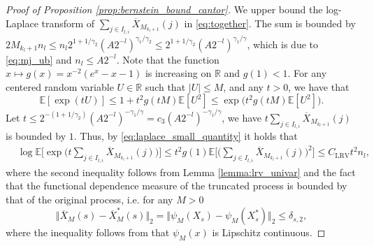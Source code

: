 \documentclass[11pt]{article}
\theoremstyle{plain}
\theoremstyle{definition}
\begin{document}
\begin{proof}[Proof of Proposition \ref{prop:bernstein_bound_cantor}]
    We upper bound the log-Laplace transform of $\sum_{j \in I_{l,i}}\overline{X}_{M_{k_l+1}}(j)$ in \eqref{eq:together}. The sum is bounded by $2M_{k_l+1}n_l \leq n_l2^{1+1/\gamma_2}(A2^{-l})^{\gamma_1/\gamma_2} \leq 2^{1+1/\gamma_2}(A2^{-l})^{\gamma_1/\gamma}$, which is due to \eqref{eq:mj_ub} and $n_l \leq A2^{-l}$. Note that the function $x \mapsto g(x) = x^{-2}(e^x-x-1)$ is increasing on $\mathbb{R}$ and $g(1) < 1$. For any centered random variable $U \in \mathbb{R}$ such that $|U| \leq M$, and any $t > 0$, we have that
    \begin{equation}\label{eq:laplace_small_quantity}
        \mathbb{E}[\exp(tU)] \leq 1+t^2g(tM)\mathbb{E}[U^2] \leq \exp\big(t^2g(tM)\mathbb{E}[U^2]\big).
    \end{equation}
    Let $t \leq 2^{-(1+1/\gamma_2)}(A2^{-l})^{-\gamma_1/\gamma} = c_3(A2^{-l})^{-\gamma_1/\gamma}$, we have $t\sum_{j \in I_{l,i}}\overline{X}_{M_{k_l+1}}(j)$ is bounded by $1$. Thus, by \eqref{eq:laplace_small_quantity} it holds that
    \begin{equation}\label{eq:individual_logLaplace}
    \begin{aligned}
        &\log\mathbb{E}\Big[\exp\Big(t\sum_{j \in I_{l,i}}\overline{X}_{M_{k_l+1}}(j)\Big)\Big] \leq t^2g(1)\mathbb{E}\Big[\Big(\sum_{j \in I_{l,i}}\overline{X}_{M_{k_l+1}}(j)\Big)^2\Big]\leq C_{\mathrm{LRV}}t^2n_l,
    \end{aligned}
    \end{equation}
    where the second inequality follows from Lemma \ref{lemma:lrv_univar} and the fact that the functional dependence measure of the truncated process is bounded by that of the original process, i.e. for any $M > 0$
    \begin{equation*}
        \big\Vert \overline{X}_{M}(s) - \overline{X}_{M}^*(s) \big\Vert_2 = \Vert \psi_{M}(X_s) - \psi_{M}(X_s^*) \Vert_2 \leq \delta_{s,2}, 
    \end{equation*}
    where the inequality follows from that $\psi_M(x)$ is Lipschitz continuous.
    

\end{proof}
\end{document}
